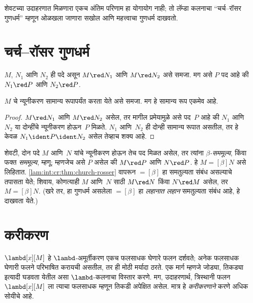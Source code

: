 शेवटच्या उदाहरणात मिळणारा एकच अंतिम परिणाम हा योगायोग नाही;
तो लॅम्डा कलनाचा “चर्च--रॉसर गुणधर्म” म्हणून ओळखला जाणारा
सखोल आणि महत्त्वाचा गुणधर्म दाखवतो.











\section{चर्च--रॉसर गुणधर्म}\label{lam:int:cr:sec}

\begin{thm}
\label{lam:int:cr:thm:church-rosser}
$M$, $N_1$ आणि $N_2$ ही पदे असून $M \red N_1$ आणि $M \red
N_2$ असे समजा. मग असे $P$ पद आहे की $N_1 \red P$ आणि $N_2 \red P$.
\end{thm}

\begin{cor}
$M$ चे न्यूनीकरण सामान्य रूपापर्यंत करता येते असे समजा. मग हे
सामान्य रूप एकमेव आहे.
\end{cor}

\begin{proof}
$M \red N_1$ आणि $M \red N_2$ असेल, तर मागील प्रमेयामुळे
असे पद~$P$ आहे की $N_1$ आणि $N_2$ या दोन्हींचे न्यूनीकरण
होऊन~$P$ मिळते. $N_1$ आणि~$N_2$ ही दोन्ही सामान्य रूपात
असतील, तर हे केवळ $N_1 \ident P \ident N_2$ असेल तेव्हाच शक्य आहे.
\end{proof}

शेवटी, दोन पदे $M$ आणि~$N$ यांचे न्यूनीकरण होऊन तेच पद मिळत
असेल, तर त्यांना \emph{$\beta$-सममूल्य}, किंवा फक्त
\emph{सममूल्य}, म्हणू; म्हणजेच असे $P$ असेल की $M
\red P$ आणि $N \red P$. हे $M \equal[\beta] N$ असे लिहितात.
\ref{lam:int:cr:thm:church-rosser} वापरून $\equal[\beta]$ हा
समतुल्यता संबंध असल्याचे तपासता येते; शिवाय, कोणत्याही $M$
आणि~$N$ साठी $M \red N$ किंवा $N \red M$ असेल, तर
$M \equal[\beta] N$. (खरे तर, हा गुणधर्म असलेला
$\equal[\beta]$ हा \emph{लहानात लहान} समतुल्यता संबंध आहे,
हे दाखवता येते.)











\section{करीकरण}\label{lam:rep:cur:sec}

$\lambd[x][M]$ हे $\lambd$-अमूर्तीकरण एकच फलसाधक घेणारे
फलन दर्शवते; अनेक फलसाधक घेणारी फलने परिभाषित करायची असतील,
तर ही मोठी मर्यादा ठरते. एक मार्ग म्हणजे जोड्या, तिकड्या इत्यादी
घडवता येतील असा $\lambd$-कलनाचा विस्तार करणे. मग, उदाहरणार्थ,
त्रिस्थानी फलन $\lambd[x][M]$ ला त्याचा फलसाधक म्हणून
तिकडी अपेक्षित असेल. मात्र हे \emph{करीकरणाने} करणे अधिक सोयीचे आहे.

